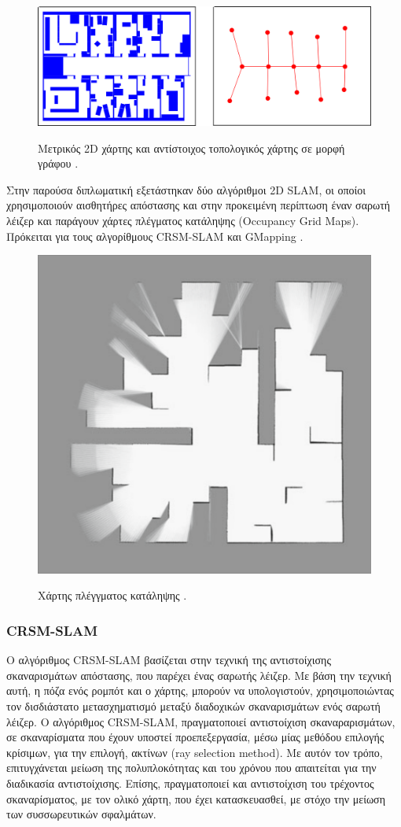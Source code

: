 \begin{figure}[!ht]
	\centering
	\includegraphics[width=0.7\linewidth]{Chapters/Chapter3/Figures/ogm_and_tm.png}
	\label{fig:ogm_and_tm}
	\caption[Μετρικός 2D χάρτης και αντίστοιχος τοπολογικός χάρτης σε μορφή γράφου.]{Μετρικός 2D χάρτης και αντίστοιχος τοπολογικός χάρτης σε μορφή γράφου \cite{probabilistic_robotics}.}
\end{figure}

\bigskip
Στην παρούσα διπλωματική εξετάστηκαν δύο αλγόριθμοι 2D SLAM, οι οποίοι χρησιμοποιούν αισθητήρες απόστασης και στην προκειμένη περίπτωση έναν {σαρωτή λέιζερ} και παράγουν χάρτες πλέγματος κατάληψης (Occupancy Grid Maps). Πρόκειται για τους αλγορίθμους CRSM-SLAM \cite{crsm} και GMapping \cite{gmapping}.

\begin{figure}[!ht]
	\centering
	\includegraphics[width=0.4\linewidth]{Chapters/Chapter3/Figures/ogm.png}
	\label{fig:ogm}
	\caption[Χάρτης πλέγγματος κατάληψης.]{Χάρτης πλέγγματος κατάληψης \cite{crsm}.}
\end{figure}

\bigskip
\subsubsection{CRSM-SLAM} \label{sssec:crsm_slam}
Ο αλγόριθμος CRSM-SLAM βασίζεται στην τεχνική της αντιστοίχισης σκαναρισμάτων απόστασης, που παρέχει ένας {σαρωτής λέιζερ}. Με βάση την τεχνική αυτή, η πόζα ενός ρομπότ και ο χάρτης, μπορούν να υπολογιστούν, χρησιμοποιώντας τον δισδιάστατο μετασχηματισμό μεταξύ διαδοχικών σκαναρισμάτων ενός σαρωτή λέιζερ. Ο αλγόριθμος CRSM-SLAM, πραγματοποιεί αντιστοίχιση σκαναραρισμάτων, σε σκαναρίσματα που έχουν υποστεί προεπεξεργασία, μέσω μίας μεθόδου επιλογής κρίσιμων, για την επιλογή, ακτίνων (ray selection method). Με αυτόν τον τρόπο, επιτυγχάνεται μείωση της πολυπλοκότητας και του χρόνου που απαιτείται για την διαδικασία αντιστοίχισης. Επίσης, πραγματοποιεί και αντιστοίχιση του τρέχοντος σκαναρίσματος, με τον ολικό χάρτη, που έχει κατασκευασθεί, με στόχο την μείωση των συσσωρευτικών σφαλμάτων.

